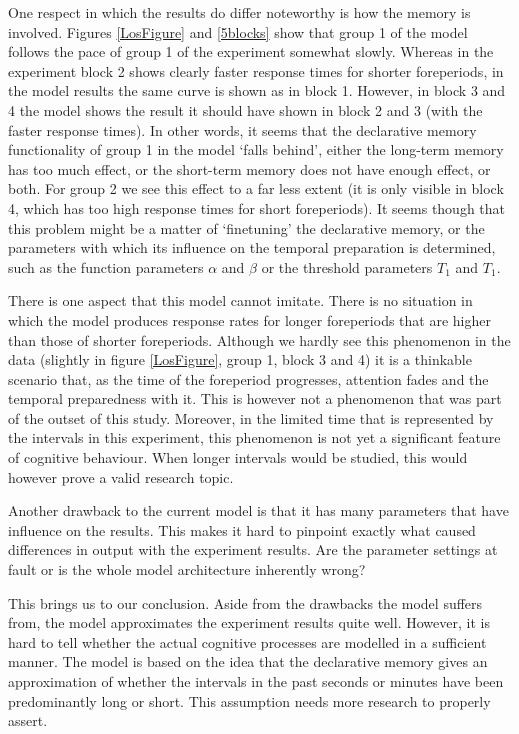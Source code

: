 \documentclass[10pt,letterpaper]{article}
\begin{document}
One respect in which the results do differ noteworthy is how the memory is involved. Figures \ref{LosFigure} and \ref{5blocks} show that group 1 of the model follows the pace of group 1 of the experiment somewhat slowly. Whereas in the experiment block 2 shows clearly faster response times for shorter foreperiods, in the model results the same curve is shown as in block 1. However, in block 3 and 4 the model shows the result it should have shown in block 2 and 3 (with the faster response times). In other words, it seems that the declarative memory functionality of group 1 in the model `falls behind', either the long-term memory has too much effect, or the short-term memory does not have enough effect, or both. For group 2 we see this effect to a far less extent (it is only visible in block 4, which has too high response times for short foreperiods). It seems though that this problem might be a matter of `finetuning' the declarative memory, or the parameters with which its influence on the temporal preparation is determined, such as the function parameters $\alpha$ and $\beta$ or the threshold parameters $T_1$ and $T_1$.

There is one aspect that this model cannot imitate. There is no situation in which the model produces response rates for longer foreperiods that are higher than those of shorter foreperiods. Although we hardly see this phenomenon in the data (slightly in figure \ref{LosFigure}, group 1, block 3 and 4) it is a thinkable scenario that, as the time of the foreperiod progresses, attention fades and the temporal preparedness with it. This is however not a phenomenon that was part of the outset of this study. Moreover, in the limited time that is represented by the intervals in this experiment, this phenomenon is not yet a significant feature of cognitive behaviour. When longer intervals would be studied, this would however prove a valid research topic.

Another drawback to the current model is that it has many parameters that have influence on the results. This makes it hard to pinpoint exactly what caused differences in output with the experiment results. Are the parameter settings at fault or is the whole model architecture inherently wrong?

This brings us to our conclusion. Aside from the drawbacks the model suffers from, the model approximates the experiment results quite well. However, it is hard to tell whether the actual cognitive processes are modelled in a sufficient manner. The model is based on the idea that the declarative memory gives an approximation of whether the intervals in the past seconds or minutes have been predominantly long or short. This assumption needs more research to properly assert. 



\setlength{\bibleftmargin}{.125in}
\setlength{\bibindent}{-\bibleftmargin}

\end{document}
